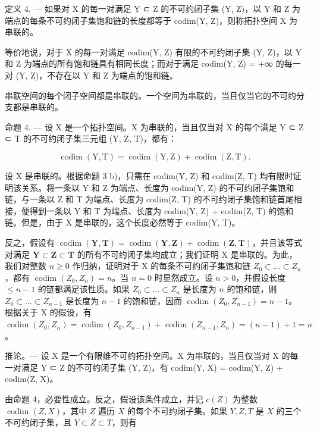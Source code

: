 定义 4. --- 如果对 X 的每一对满足 Y ⊂ Z 的不可约闭子集 (Y, Z)，以 Y 和 Z 为端点的每条不可约闭子集饱和链的长度都等于 codim(Y, Z)，则称拓扑空间 X 为串联的。

等价地说，对于 X 的每一对满足 codim(Y, Z) 有限的不可约闭子集 (Y, Z)，以 Y 和 Z 为端点的所有饱和链具有相同长度；而对于满足 codim(Y, Z) = +∞ 的每一对 (Y, Z)，不存在以 Y 和 Z 为端点的饱和链。

串联空间的每个闭子空间都是串联的。一个空间为串联的，当且仅当它的不可约分支都是串联的。

命题 4. --- 设 X 是一个拓扑空间。X 为串联的，当且仅当对 X 的每个满足 Y ⊂ Z ⊂ T 的不可约闭子集三元组 (Y, Z, T)，都有：

\[
\operatorname{codim} (\mathrm{Y}, \mathrm{T}) = \operatorname{codim} (\mathrm{Y}, \mathrm{Z}) + \operatorname{codim} (\mathrm{Z}, \mathrm{T}).
\]

设 X 是串联的。根据命题 3 b)，只需在 codim(Y, Z) 和 codim(Z, T) 均有限时证明该关系。将一条以 Y 和 Z 为端点、长度为 codim(Y, Z) 的不可约闭子集饱和链，与一条以 Z 和 T 为端点、长度为 codim(Z, T) 的不可约闭子集饱和链首尾相接，便得到一条以 Y 和 T 为端点、长度为 codim(Y, Z) + codim(Z, T) 的饱和链。但是，由于 X 是串联的，这个长度必然等于 codim(Y, T)。

反之，假设有 \(\operatorname{codim}(\mathbf{Y},\mathbf{T})=\operatorname{codim}(\mathbf{Y},\mathbf{Z})+\operatorname{codim}(\mathbf{Z},\mathbf{T})\)，并且该等式对满足 \(\mathbf{Y}\subset\mathbf{Z}\subset\mathbf{T}\) 的所有不可约闭子集均成立；我们证明 X 是串联的。为此，我们对整数 \(n\geqslant0\) 作归纳，证明对于 X 的每条不可约闭子集饱和链 \(Z_{0}\subset\ldots\subset Z_{n}\)，都有 \(\operatorname{codim}(Z_{0},Z_{n})=n\)。当 \(n=0\) 时显然成立。设 \(n>0\)，并假设长度 \(\leqslant n-1\) 的链都满足该性质。如果 \(Z_{0}\subset\ldots\subset Z_{n}\) 是长度为 \(n\) 的饱和链，则 \(Z_{0}\subset\ldots\subset Z_{n-1}\) 是长度为 \(n-1\) 的饱和链，因而 \(\operatorname{codim}(Z_{0},Z_{n-1})=n-1\)。根据关于 X 的假设，有 \(\operatorname{codim}(Z_{0},Z_{n})=\operatorname{codim}(Z_{0},Z_{n-1})+\operatorname{codim}(Z_{n-1},Z_{n})=(n-1)+1=n\)。

推论。— 设 X 是一个有限维不可约拓扑空间。X 为串联的，当且仅当对 X 的每一对满足 Y ⊂ Z 的不可约闭子集 (Y, Z)，有 codim(Y, X) = codim(Y, Z) + codim(Z, X)。

由命题 4，必要性成立。反之，假设该条件成立，并记 \(c(Z)\) 为整数 \(\operatorname{codim}(Z,X)\)，其中 \(Z\) 遍历 \(X\) 的每个不可约闭子集。如果 \(Y,Z,T\) 是 \(X\) 的三个不可约闭子集，且 \(Y\subset Z\subset T\)，则有

